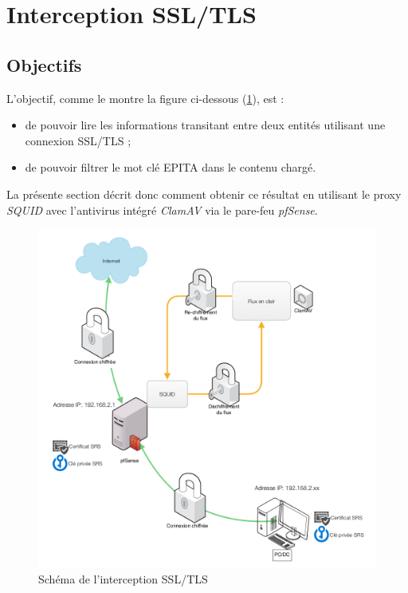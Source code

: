 \section{Interception SSL/TLS}

\subsection{Objectifs}
L'objectif, comme le montre la figure ci-dessous (\ref{Schema_tls/1}), est : 
\begin{itemize}
    \item de pouvoir lire les informations transitant entre deux entités utilisant une connexion SSL/TLS ;
    \item de pouvoir filtrer le mot clé EPITA dans le contenu chargé.
\end{itemize}
La présente section décrit donc comment obtenir ce résultat en utilisant le proxy \textit{SQUID} avec l'antivirus intégré \textit{ClamAV} via le pare-feu \textit{pfSense}.
\newpage
\begin{figure}[h!]
    \begin{center}
        \includegraphics[scale=0.5]{Interception_Screenshots/schema.jpeg}
        \caption{Schéma de l'interception SSL/TLS}
        \label{Schema_tls/1}
    \end{center}
\end{figure}
\FloatBarrier 

